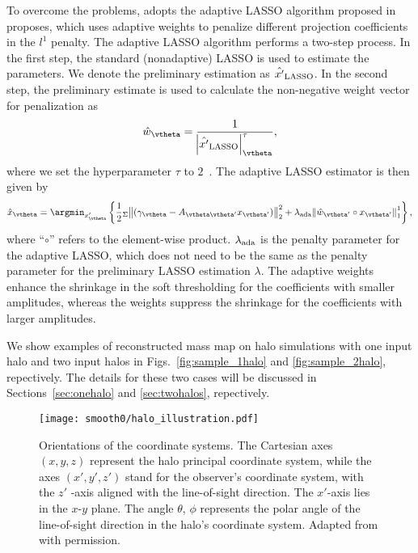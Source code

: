 \documentclass[twocolumn, usenames, dvipsnames]{aastex63}
\begin{document}
To overcome the problems, \citep{massmap_Li2021} adopts the adaptive LASSO
algorithm proposed in \citet{AdaLASSO-Zou2006} proposes, which uses adaptive
weights to penalize different projection coefficients in the $l^1$ penalty. The
adaptive LASSO algorithm performs a two-step process. In the first step, the
standard (nonadaptive) LASSO is used to estimate the parameters. We denote
the preliminary estimation as $\hat{x'}_{\rm{LASSO}}$. In the second step, the
preliminary estimate is used to calculate the non-negative weight vector for
penalization as
\begin{equation}
\hat{w}_\vtheta= \frac{1}{\abs{\hat{x'}_{\rm{LASSO}}}_{\vtheta}^\tau},
\end{equation}
where we set the hyperparameter $\tau$ to $2\,$ \citep{massmap_Li2021}. The
adaptive LASSO estimator is then given by
\begin{equation}\label{eq-lossFun}
\hat{x}_{\vtheta}=\argmin_{x_\vtheta'} \left\{
\frac{1}{2} {}_\Sigma\norm{(\gamma_\vtheta - A_{\vtheta \vtheta'} x_{\vtheta'} )}_2^2+
\lambda_\text{ada} \norm{\hat{w}_{\vtheta'} \circ x_{\vtheta'}}^1_1\right\},
\end{equation}
where ``$\circ$'' refers to the element-wise product. $\lambda_{\rm{ada}}$ is
the penalty parameter for the adaptive LASSO, which does not need to be the
same as the penalty parameter for the preliminary LASSO estimation $\lambda$.
The adaptive weights enhance the shrinkage in the soft thresholding for the
coefficients with smaller amplitudes, whereas the weights suppress the
shrinkage for the coefficients with larger amplitudes.

We show examples of reconstructed mass map on halo simulations with one input
halo and two input halos in Figs.~\ref{fig:sample_1halo} and
\ref{fig:sample_2halo}, repectively. The details for these two cases will be
discussed in Sections~\ref{sec:onehalo} and \ref{sec:twohalos}, repectively.

\begin{figure}[!ht]
\centering
\texttt{[image: smooth0/halo\_illustration.pdf]}
\caption{
    Orientations of the coordinate systems. The Cartesian axes $(x,y,z)$
    represent the halo principal coordinate system, while the axes $(x', y',
    z')$ stand for the observer’s coordinate system, with the $z'$ -axis
    aligned with the line-of-sight direction. The $x'$-axis lies in the $x$-$y$
    plane. The angle $\theta$, $\phi$ represents the polar angle of the
    line-of-sight direction in the halo's coordinate system. Adapted from
    \cite{halo_OLS03} with permission.
    }
    \label{fig:halo_illustration}
\end{figure}
\end{document}
